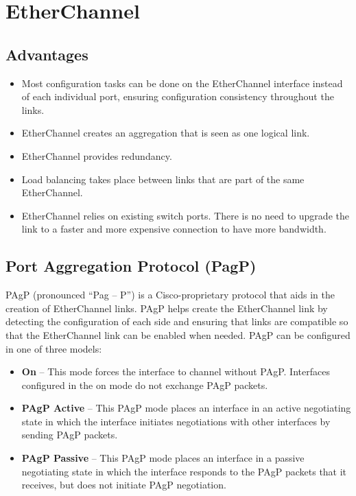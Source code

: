 \chapter{EtherChannel}

\section{Advantages}

\begin{itemize}
\item Most configuration tasks can be done on the EtherChannel interface instead of each individual port, ensuring configuration consistency throughout the links.
\item EtherChannel creates an aggregation that is seen as one logical link. 
\item EtherChannel provides redundancy.
\item Load balancing takes place between links that are part of the same EtherChannel. 
\item EtherChannel relies on existing switch ports. There is no need to upgrade the link to a faster and more expensive connection to have more bandwidth.
\end{itemize}

\section{Port Aggregation Protocol (PagP)}

PAgP (pronounced ``Pag – P”) is a Cisco-proprietary protocol that aids in the  creation of EtherChannel links. PAgP helps create the EtherChannel link by detecting the configuration of each side and ensuring that links are compatible so that the EtherChannel link can be enabled when needed. PAgP can be configured in one of three models:

\begin{itemize}
\item \textbf{On} -- This mode forces the interface to channel without PAgP. Interfaces configured in the on mode do not exchange PAgP packets.
\item \textbf{PAgP Active} -- This PAgP mode places an interface in an active negotiating state in which the interface initiates negotiations with other interfaces by sending PAgP packets.
\item \textbf{PAgP Passive} -- This PAgP mode places an interface in a passive negotiating state in which the interface responds to the PAgP packets that it receives, but does not initiate PAgP negotiation.
\end{itemize}

